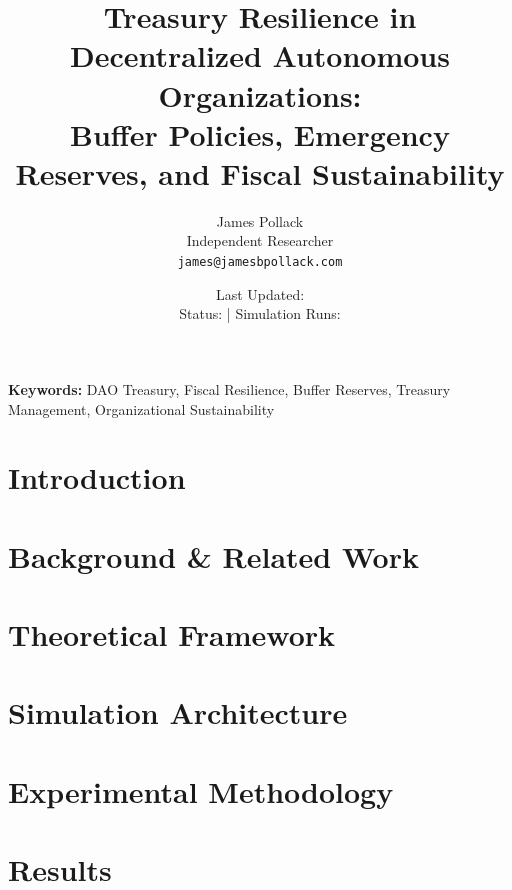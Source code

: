 \documentclass[11pt]{article}
\title{
    \textbf{Treasury Resilience in Decentralized Autonomous Organizations:}\\
    \large Buffer Policies, Emergency Reserves, and Fiscal Sustainability
}
\author{
    James Pollack\\
    Independent Researcher\\
    \texttt{james@jamesbpollack.com}
}
\date{
    Last Updated: \lastupdate\\
    \small Status: \paperstatus{} | Simulation Runs: \experimentruns{}
}
\begin{document}
\maketitle

\begin{abstract}

\end{abstract}

\textbf{Keywords:} DAO Treasury, Fiscal Resilience, Buffer Reserves, Treasury Management, Organizational Sustainability


\section{Introduction}
\label{sec:introduction}


\section{Background \& Related Work}
\label{sec:background}


\section{Theoretical Framework}
\label{sec:theory}


\section{Simulation Architecture}
\label{sec:architecture}


\section{Experimental Methodology}
\label{sec:methodology}


\section{Results}
\label{sec:results}

\end{document}
